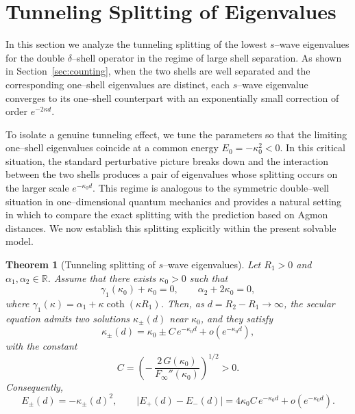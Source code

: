\documentclass[a4paper,11pt]{article}
\numberwithin{equation}{section}
\newtheorem{thm}{Theorem}
\theoremstyle{definition}
\theoremstyle{remark}
\begin{document}
\section{Tunneling Splitting of Eigenvalues}\label{sec:tunneling}

In this section we analyze the tunneling splitting of the lowest $s$--wave
eigenvalues for the double $\delta$--shell operator in the regime of large shell
separation.
As shown in Section~\ref{sec:counting}, when the two shells are well separated
and the corresponding one--shell eigenvalues are distinct, each $s$--wave
eigenvalue converges to its one--shell counterpart with an exponentially small
correction of order $e^{-2\kappa d}$.

To isolate a genuine tunneling effect, we tune the parameters so that the
limiting one--shell eigenvalues coincide at a common energy
$E_0=-\kappa_0^2<0$.
In this critical situation, the standard perturbative picture breaks down and
the interaction between the two shells produces a pair of eigenvalues whose
splitting occurs on the larger scale $e^{-\kappa_0 d}$.
This regime is analogous to the symmetric double--well situation in
one--dimensional quantum mechanics and provides a natural setting in which to
compare the exact splitting with the prediction based on Agmon distances.
We now establish this splitting explicitly within the present solvable model.

\begin{thm}[Tunneling splitting of $s$--wave eigenvalues]\label{thm:tunnel}
Let $R_1>0$ and $\alpha_1,\alpha_2\in\mathbb R$.
Assume that there exists $\kappa_0>0$ such that
\begin{equation}\label{eq:tuning}
\gamma_1(\kappa_0)+\kappa_0=0,\qquad \alpha_2+2\kappa_0=0,
\end{equation}
where $\gamma_1(\kappa)=\alpha_1+\kappa\coth(\kappa R_1)$.
Then, as $d=R_2-R_1\to\infty$, the secular equation admits two solutions
$\kappa_\pm(d)$ near $\kappa_0$, and they satisfy
\begin{equation}\label{eq:kappa-split}
\kappa_\pm(d)=\kappa_0\pm C\,e^{-\kappa_0 d}+o(e^{-\kappa_0 d}),
\end{equation}
with the constant
\begin{equation}\label{eq:C-constant}
C=\left(-\,\frac{2\,G(\kappa_0)}{F_\infty''(\kappa_0)}\right)^{1/2}>0 .
\end{equation}
Consequently,
\begin{equation}\label{eq:E-split}
E_\pm(d)=-\kappa_\pm(d)^2,\qquad
\bigl|E_+(d)-E_-(d)\bigr|
=4\kappa_0C\,e^{-\kappa_0 d}+o(e^{-\kappa_0 d}) .
\end{equation}
\end{thm}
\end{document}

